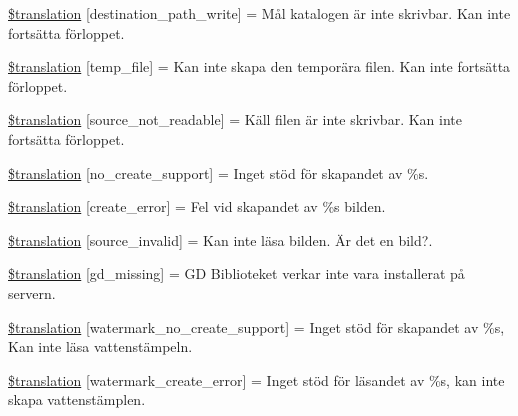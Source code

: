 \begin{DoxyCompactItemize}
\item 
\hyperlink{class_8upload_8sv___s_e_8php_a40e4e1962226b89fd76da5819a9602b0}{\$translation} \mbox{[}\textquotesingle{}destination\+\_\+path\+\_\+write\textquotesingle{}\mbox{]} = \textquotesingle{}Mål katalogen är inte skrivbar. Kan inte fortsätta förloppet.\textquotesingle{}
\item 
\hyperlink{class_8upload_8sv___s_e_8php_a2baece8da11e20d45175db91851ec3e3}{\$translation} \mbox{[}\textquotesingle{}temp\+\_\+file\textquotesingle{}\mbox{]} = \textquotesingle{}Kan inte skapa den temporära filen. Kan inte fortsätta förloppet.\textquotesingle{}
\item 
\hyperlink{class_8upload_8sv___s_e_8php_a922967ca2df0efdd455261142d8e5715}{\$translation} \mbox{[}\textquotesingle{}source\+\_\+not\+\_\+readable\textquotesingle{}\mbox{]} = \textquotesingle{}Käll filen är inte skrivbar. Kan inte fortsätta förloppet.\textquotesingle{}
\item 
\hyperlink{class_8upload_8sv___s_e_8php_a346dfd1ade29f583dd20d345c436859f}{\$translation} \mbox{[}\textquotesingle{}no\+\_\+create\+\_\+support\textquotesingle{}\mbox{]} = \textquotesingle{}Inget stöd för skapandet av \%s.\textquotesingle{}
\item 
\hyperlink{class_8upload_8sv___s_e_8php_a53013ce9255c4e1849098ddd9fdb2b3f}{\$translation} \mbox{[}\textquotesingle{}create\+\_\+error\textquotesingle{}\mbox{]} = \textquotesingle{}Fel vid skapandet av \%s bilden.\textquotesingle{}
\item 
\hyperlink{class_8upload_8sv___s_e_8php_a6ab0a660b457eaf2d3434b225449fdd6}{\$translation} \mbox{[}\textquotesingle{}source\+\_\+invalid\textquotesingle{}\mbox{]} = \textquotesingle{}Kan inte läsa bilden. Är det en bild?.\textquotesingle{}
\item 
\hyperlink{class_8upload_8sv___s_e_8php_a7f3dfcc0db4bbc0f2e7210c439798e56}{\$translation} \mbox{[}\textquotesingle{}gd\+\_\+missing\textquotesingle{}\mbox{]} = \textquotesingle{}G\+D Biblioteket verkar inte vara installerat på servern.\textquotesingle{}
\item 
\hyperlink{class_8upload_8sv___s_e_8php_a82d5853430ab72dc1f9799ec36144cc6}{\$translation} \mbox{[}\textquotesingle{}watermark\+\_\+no\+\_\+create\+\_\+support\textquotesingle{}\mbox{]} = \textquotesingle{}Inget stöd för skapandet av \%s, Kan inte läsa vattenstämpeln.\textquotesingle{}
\item 
\hyperlink{class_8upload_8sv___s_e_8php_aabca0b65dadbc6184415c16375f284ca}{\$translation} \mbox{[}\textquotesingle{}watermark\+\_\+create\+\_\+error\textquotesingle{}\mbox{]} = \textquotesingle{}Inget stöd för läsandet av \%s, kan inte skapa vattenstämplen.\textquotesingle{}

\end{DoxyCompactItemize}
